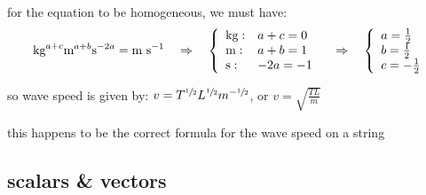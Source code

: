for the equation to be homogeneous, we must have:
\begin{equation*}
	\text{kg}^{a+c} \text{m}^{a+b} \text{s}^{-2a} = \text{m s}^{-1} \quad \Rightarrow \quad
	\left\{ \begin{array}{ll}
	\text{kg}: & a+c=0 \\
	\text{m}: & a+b=1 \\
	\text{s}: & -2a=-1 \\
	\end{array}\right.
	\quad \Rightarrow \quad \left\{ \begin{array}{l}
	a=\tfrac{1}{2} \\
	b=\tfrac{1}{2} \\
	c=-\tfrac{1}{2} \\
	\end{array}\right.
\end{equation*}

so wave speed is given by: $v = T^{\sfrac{1}{2}} L^{\sfrac{1}{2}} m^{-\sfrac{1}{2}}$, or $v=\sqrt{\frac{TL}{m}}$

this happens to be the correct formula for the wave speed on a string \eoe


%	
%	
%	
%	
%	
%	
%	
%	
	



\subsection{scalars \& vectors}

